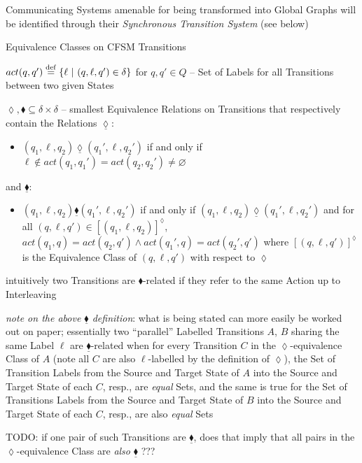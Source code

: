 Communicating Systems amenable for being transformed into Global
Graphs will be identified through their \emph{Synchronous Transition
  System} (see below)


Equivalence Classes on CFSM Transitions

$act(q,q') \stackrel{\mathrm{def}}= \{ \ell \ |\ (q,\ell,q') \in \delta \}$ for $q,q'
\in Q$ -- Set of Labels for all Transitions between two given States

$\lozenge,\blacklozenge \subseteq \delta \times \delta$ -- smallest
Equivalence Relations on Transitions that respectively contain the
Relations $\underline{\lozenge}$:

\begin{itemize}
\item $(q_1,\ell,q_2)\underline{\lozenge}(q_1',\ell,q_2')$ if and only
  if $\ell \notin act(q_1,q_1') = act(q_2,q_2') \neq \varnothing$
\end{itemize}

and $\underline{\blacklozenge}$:

\begin{itemize}
\item $(q_1,\ell,q_2)\underline{\blacklozenge}(q_1',\ell,q_2')$ if and
  only if $(q_1,\ell,q_2)\underline{\lozenge}(q_1',\ell,q_2')$ and for
  all $(q,\ell,q') \in [(q_1,\ell,q_2)]^\lozenge$, $act(q_1,q) =
  act(q_2,q') \wedge act(q_1',q) = act(q_2',q')$ where
  $[(q,\ell,q')]^\lozenge$ is the Equivalence Class of $(q,\ell,q')$
  with respect to $\lozenge$
\end{itemize}
intuitively two Transitions are $\blacklozenge$-related if they refer
to the same Action up to Interleaving

\emph{note on the above $\underline{\blacklozenge}$ definition}: what
is being stated can more easily be worked out on paper; essentially
two ``parallel'' Labelled Transitions $A$, $B$ sharing the same Label
$\ell$ are $\underline{\blacklozenge}$-related when for every
Transition $C$ in the $\lozenge$-equivalence Class of $A$ (note all
$C$ are also $\ell$-labelled by the definition of $\lozenge$), the Set
of Transition Labels from the Source and Target State of $A$ into the
Source and Target State of each $C$, resp., are \emph{equal} Sets, and
the same is true for the Set of Transitions Labels from the Source and
Target State of $B$ into the Source and Target State of each $C$,
resp., are also \emph{equal} Sets

TODO: if one pair of such Transitions are $\underline{\blacklozenge}$,
does that imply that all pairs in the $\lozenge$-equivalence Class are
\emph{also} $\underline{\blacklozenge}$ ???

